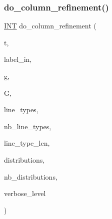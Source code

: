 \subsubsection{\texorpdfstring{do\+\_\+column\+\_\+refinement()}{do\_column\_refinement()}}
{\footnotesize\ttfamily \mbox{\hyperlink{galois_8h_a09fddde158a3a20bd2dcadb609de11dc}{I\+NT}} do\+\_\+column\+\_\+refinement (\begin{DoxyParamCaption}\item[{\mbox{\hyperlink{galois_8h_a09fddde158a3a20bd2dcadb609de11dc}{I\+NT}}}]{t,  }\item[{\mbox{\hyperlink{galois_8h_ab6cc7b4aeb6ea31aba2b3fbfc83ff5e6}{B\+Y\+TE}} $\ast$}]{label\+\_\+in,  }\item[{ofstream \&}]{g,  }\item[{\mbox{\hyperlink{classtdo__scheme}{tdo\+\_\+scheme}} \&}]{G,  }\item[{\mbox{\hyperlink{galois_8h_a09fddde158a3a20bd2dcadb609de11dc}{I\+NT}} $\ast$}]{line\+\_\+types,  }\item[{\mbox{\hyperlink{galois_8h_a09fddde158a3a20bd2dcadb609de11dc}{I\+NT}}}]{nb\+\_\+line\+\_\+types,  }\item[{\mbox{\hyperlink{galois_8h_a09fddde158a3a20bd2dcadb609de11dc}{I\+NT}}}]{line\+\_\+type\+\_\+len,  }\item[{\mbox{\hyperlink{galois_8h_a09fddde158a3a20bd2dcadb609de11dc}{I\+NT}} $\ast$}]{distributions,  }\item[{\mbox{\hyperlink{galois_8h_a09fddde158a3a20bd2dcadb609de11dc}{I\+NT}}}]{nb\+\_\+distributions,  }\item[{\mbox{\hyperlink{galois_8h_a09fddde158a3a20bd2dcadb609de11dc}{I\+NT}}}]{verbose\+\_\+level }\end{DoxyParamCaption})}

\mbox{\label{tdo__refine__all_8_c_a3ad2018e9a246d4939a45e255e9a513f}} 
